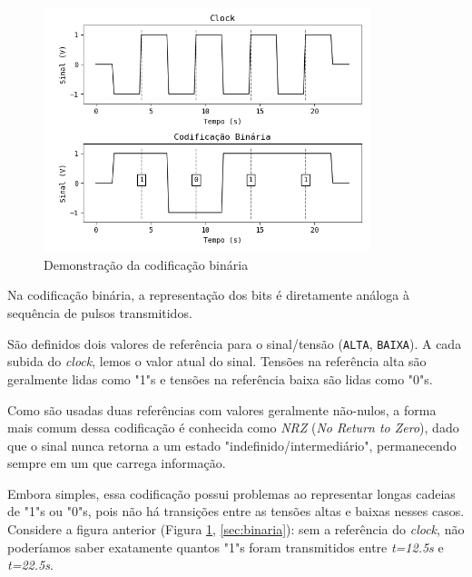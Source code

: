 \documentclass[titlepage,twocolumn]{article}
\begin{document}
\begin{figure}[H]
    \begin{center}
        \includegraphics[width=9.5cm]{imgs/codificacao_bnaria.png}
        \caption{Demonstração da codificação binária}
        \label{fig:binaria}
    \end{center}
\end{figure}

Na codificação binária, a representação dos bits é diretamente análoga à sequência de pulsos transmitidos.

São definidos dois valores de referência para o sinal/tensão (\texttt{ALTA}, \texttt{BAIXA}). A cada subida do \textit{clock}, lemos o valor atual do sinal. Tensões na referência alta são geralmente lidas como "1"s e tensões na referência baixa são lidas como "0"s.

Como são usadas duas referências com valores geralmente não-nulos, a forma mais comum dessa codificação é conhecida como \textit{NRZ} (\textit{No Return to Zero}), dado que o sinal nunca retorna a um estado "indefinido/intermediário", permanecendo sempre em um que carrega informação.

Embora simples, essa codificação possui problemas ao representar longas cadeias de "1"s ou "0"s, pois não há transições entre as tensões altas e baixas nesses casos. Considere a figura anterior (Figura \ref{fig:binaria}, \ref{sec:binaria}): sem a referência do \textit{clock}, não poderíamos saber exatamente quantos "1"s foram transmitidos entre \textit{t=12.5s} e \textit{t=22.5s}.
\end{document}
